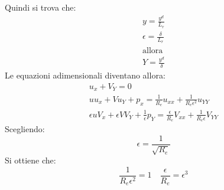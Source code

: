 %
Quindi si trova che:
%
	\begin{equation*}
		\begin{gathered}
			y = \frac{y^d}{L_r}\\
			\epsilon = \frac{\delta}{L_r}\\
			\text{allora}\\
			Y = \frac{y^d}{\delta}
		\end{gathered}
	\end{equation*}
%
Le equazioni adimensionali diventano allora:
%
	\begin{equation*}
		\begin{gathered}
			u_x + V_Y = 0\\
			u u_x + V u_Y + p_x = \frac{1}{R_e} u_{xx} + \frac{1}{R_e \epsilon^2} u_{YY}\\
			\epsilon u V_x + \epsilon V V_Y + \frac{1}{\epsilon} p_Y = \frac{\epsilon}{R_e} V_{xx} + \frac{1}{R_e \epsilon} V_{YY}
		\end{gathered}
	\end{equation*}
%
Scegliendo:
%
	\begin{equation*}
	 	\epsilon = \frac{1}{\sqrt{R_e}}
	\end{equation*}
%
Si ottiene che:
%
	\begin{equation*}
	 	\frac{1}{R_e \epsilon^2} = 1 \quad \frac{\epsilon}{R_e} = \epsilon^3
	\end{equation*}
%

